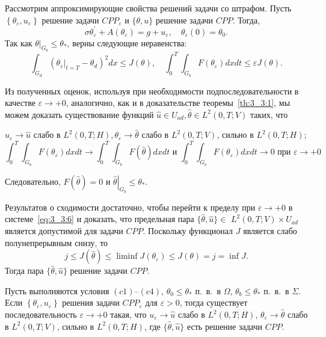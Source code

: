 Рассмотрим аппроксимирующие свойства решений задачи со штрафом.
Пусть $\left\{\theta_{\varepsilon}, u_{\varepsilon}\right\}$ решение задачи
$CPP_{\varepsilon}$ и $\{\theta, u\}$ решение задачи $CPP$.
Тогда,
\begin{equation}
    \label{eq:3_3:6}
    \sigma \theta_{\varepsilon}^{\prime}
    + A\left(\theta_{\varepsilon}\right)=g + u_{\varepsilon},
    \quad \theta_{\varepsilon}(0) = \theta_{0}.
\end{equation}
Так как $\left.\theta\right|_{G_{b}} \leq \theta_{*}$, верны следующие неравенства:
\[
    \int_{G_{d}}\left(\left.\theta_{\varepsilon}\right|_{t=T}-\theta_{d}\right)^{2} d x \leq J(\theta),
    \quad \int_{0}^{T} \int_{G_{b}} F\left(\theta_{\varepsilon}\right) d x d t \leq \varepsilon J(\theta).
\]


Из полученных оценок, используя при необходимости подпоследовательности в качестве
$\varepsilon \rightarrow+0$, аналогично, как и в доказательстве теоремы~\ref{th:3_3:1},
мы можем доказать существование функций
$\widehat{u} \in U_{a d}, \widehat{\theta} \in L^{2}(0, T ; V)$ таких, что

$u_{\varepsilon} \rightarrow \widehat{u}$ слабо в
$L^{2}(0, T ; H), \theta_{\varepsilon} \rightarrow \widehat{\theta}$ слабо в $L^{2}(0, T ; V)$,
сильно в $L^{2}(0, T ; H)$;
\[
    \int_{0}^{T} \int_{G_{b}} F\left(\theta_{\varepsilon}\right) d x d t \rightarrow \int_{0}^{T}
    \int_{G_{b}} F(\widehat{\theta}) dx dt\text { и }\int_{0}^{T} \int_{G_{b}}
    F\left(\theta_{\varepsilon}\right) dx dt \rightarrow 0
    \text{ при } \varepsilon \rightarrow+0
\]

Следовательно, $F(\widehat{\theta})=0$ и
$\left.\widehat{\theta}\right|_{G_{b}} \leq \theta_{*}$.

Результатов о сходимости достаточно, чтобы перейти к пределу при $\varepsilon \rightarrow+0$
в системе~\eqref{eq:3_3:6} и доказать, что предельная пара
$\{\widehat{\theta}, \widehat{u}\} \in$ $L^{2}(0, T ; V) \times U_{a d}$
является допустимой для задачи $CPP$.
Поскольку функционал $J$ является слабо полунепрерывным снизу, то
\[
    j \leq J(\widehat{\theta}) \leq \liminf J\left(\theta_{\varepsilon}\right) \leq J(\theta)=j=\inf J.
\]
Тогда пара $\{\widehat{\theta}, \widehat{u}\}$ решение задачи $CPP$.
\begin{theorem}
    Пусть выполняются условия $(c1)$--$(c4)$,
    $\theta_{0} \leq \theta_{*}$ п.\ в.\ в
    $\Omega$, $\theta_{b} \leq \theta_{*}$ п.\ в.\ в $\Sigma$.
    Если $\left\{\theta_{\varepsilon}, u_{\varepsilon}\right\}$ решения задачи
    $CPP_{\varepsilon}$ для $\varepsilon>0$, тогда существует последовательность
    $\varepsilon \rightarrow+0$ такая, что $u_{\varepsilon} \rightarrow \widehat{u}$ слабо в
    $L^{2}(0, T ; H), \, \theta_{\varepsilon} \rightarrow \widehat{\theta}$
    слабо в $L^{2}(0, T ; V)$, сильно в $L^{2}(0, T ; H)$, где
    $\{\widehat{\theta}, \widehat{u}\}$ есть решение задачи $CPP$.
\end{theorem}
